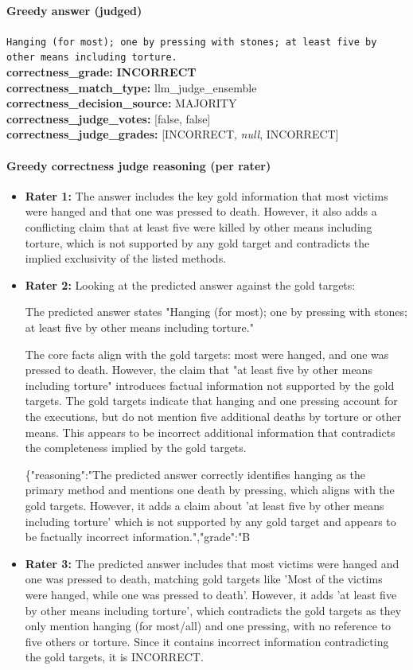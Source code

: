 \documentclass[11pt]{article}
\newcommand{\gradebad}[1]{\textcolor{red!70!black}{\textbf{#1}}}
\newcommand{\mono}[1]{\texttt{#1}}
\begin{document}
\paragraph{Greedy answer (judged)}
\mono{Hanging (for most); one by pressing with stones; at least five by other means including torture.}\\
\textbf{correctness\_grade:} \gradebad{INCORRECT}\\
\textbf{correctness\_match\_type:} llm\_judge\_ensemble\\
\textbf{correctness\_decision\_source:} MAJORITY\\
\textbf{correctness\_judge\_votes:} [false, false]\\
\textbf{correctness\_judge\_grades:} [INCORRECT, \emph{null}, INCORRECT]\\
\paragraph{Greedy correctness judge reasoning (per rater)}
\begin{itemize}
\item \textbf{Rater 1:} The answer includes the key gold information that most victims were hanged and that one was pressed to death. However, it also adds a conflicting claim that at least five were killed by other means including torture, which is not supported by any gold target and contradicts the implied exclusivity of the listed methods.
\item \textbf{Rater 2:} Looking at the predicted answer against the gold targets:

The predicted answer states "Hanging (for most); one by pressing with stones; at least five by other means including torture."

The core facts align with the gold targets: most were hanged, and one was pressed to death. However, the claim that "at least five by other means including torture" introduces factual information not supported by the gold targets. The gold targets indicate that hanging and one pressing account for the executions, but do not mention five additional deaths by torture or other means. This appears to be incorrect additional information that contradicts the completeness implied by the gold targets.

\{"reasoning":"The predicted answer correctly identifies hanging as the primary method and mentions one death by pressing, which aligns with the gold targets. However, it adds a claim about 'at least five by other means including torture' which is not supported by any gold target and appears to be factually incorrect information.","grade":"B
\item \textbf{Rater 3:} The predicted answer includes that most victims were hanged and one was pressed to death, matching gold targets like 'Most of the victims were hanged, while one was pressed to death'. However, it adds 'at least five by other means including torture', which contradicts the gold targets as they only mention hanging (for most/all) and one pressing, with no reference to five others or torture. Since it contains incorrect information contradicting the gold targets, it is INCORRECT.
\end{itemize}
\end{document}
